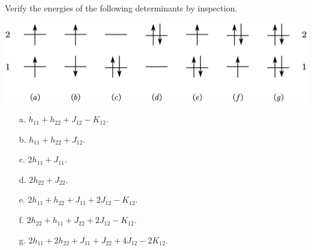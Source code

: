 \documentclass[a4paper]{book}
\newcounter{exercise}[chapter]
\begin{document}
	\begin{exercise}
	Verify the energies of the following determinants by inspection.
	
	\begin{center}
	\includegraphics[scale=1.0]{./pictures/2.23/exercise.png}
	\end{center}
	
	\begin{enumerate}
	
	\item[a.] $h_{11} + h_{22} +  J_{12} - K_{12}$.
	
	\item[b.] $h_{11} + h_{22} +  J_{12}$.
	
	\item[c.] $2h_{11} +  J_{11}$.
	
	\item[d.] $2h_{22} +  J_{22}$.
	
	\item[e.] $2h_{11} + h_{22} +  J_{11} + 2J_{12} - K_{12}$.
	
	\item[f.] $2h_{22} + h_{11} +  J_{22} + 2J_{12} - K_{12}$.
	
	\item[g.] $2h_{11} + 2h_{22} +  J_{11} +  J_{22} + 4J_{12} - 2K_{12}$.
	
	\end{enumerate}		
	
	\end{exercise}
	
\end{document}
